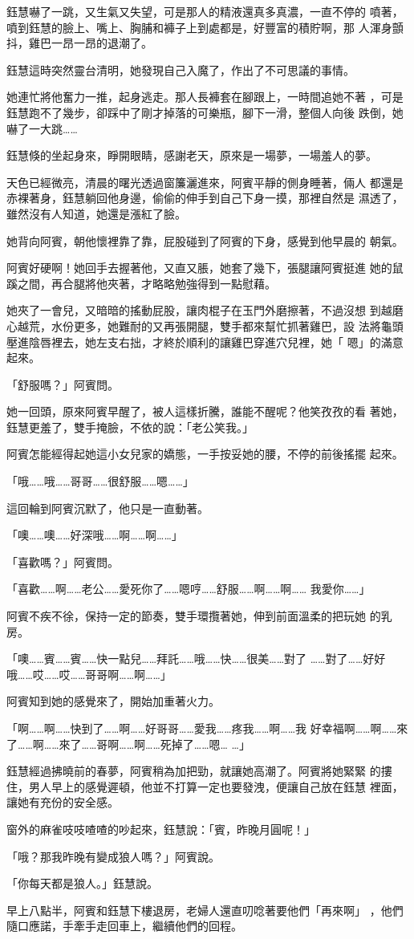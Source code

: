 鈺慧嚇了一跳，又生氣又失望，可是那人的精液還真多真濃，一直不停的
噴著，噴到鈺慧的臉上、嘴上、胸脯和褲子上到處都是，好豐富的積貯啊，那
人渾身顫抖，雞巴一昂一昂的退潮了。

鈺慧這時突然靈台清明，她發現自己入魔了，作出了不可思議的事情。

她連忙將他奮力一推，起身逃走。那人長褲套在腳跟上，一時間追她不著
，可是鈺慧跑不了幾步，卻踩中了剛才掉落的可樂瓶，腳下一滑，整個人向後
跌倒，她嚇了一大跳……

鈺慧倏的坐起身來，睜開眼睛，感謝老天，原來是一場夢，一場羞人的夢。

天色已經微亮，清晨的曙光透過窗簾灑進來，阿賓平靜的側身睡著，倆人
都還是赤裸著身，鈺慧躺回他身邊，偷偷的伸手到自己下身一摸，那裡自然是
濕透了，雖然沒有人知道，她還是漲紅了臉。

她背向阿賓，朝他懷裡靠了靠，屁股碰到了阿賓的下身，感覺到他早晨的
朝氣。

阿賓好硬啊！她回手去握著他，又直又脹，她套了幾下，張腿讓阿賓挺進
她的鼠蹊之間，再合腿將他夾著，才略略勉強得到一點慰藉。

她夾了一會兒，又暗暗的搖動屁股，讓肉棍子在玉門外磨擦著，不過沒想
到越磨心越荒，水份更多，她難耐的又再張開腿，雙手都來幫忙抓著雞巴，設
法將龜頭壓進陰唇裡去，她左支右拙，才終於順利的讓雞巴穿進穴兒裡，她「
嗯」的滿意起來。

「舒服嗎？」阿賓問。

她一回頭，原來阿賓早醒了，被人這樣折騰，誰能不醒呢？他笑孜孜的看
著她，鈺慧更羞了，雙手掩臉，不依的說：「老公笑我。」

阿賓怎能經得起她這小女兒家的嬌態，一手按妥她的腰，不停的前後搖擺
起來。

「哦……哦……哥哥……很舒服……嗯……」

這回輪到阿賓沉默了，他只是一直動著。

「噢……噢……好深哦……啊……啊……」

「喜歡嗎？」阿賓問。

「喜歡……啊……老公……愛死你了……嗯哼……舒服……啊……啊……
我愛你……」

阿賓不疾不徐，保持一定的節奏，雙手環攬著她，伸到前面溫柔的把玩她
的乳房。

「噢……賓……賓……快一點兒……拜託……哦……快……很美……對了
……對了……好好哦……哎……哎……哥哥啊……啊……」

阿賓知到她的感覺來了，開始加重著火力。

「啊……啊……快到了……啊……好哥哥……愛我……疼我……啊……我
好幸福啊……啊……來了……啊……來了……哥啊……啊……死掉了……嗯…
…」

鈺慧經過拂曉前的春夢，阿賓稍為加把勁，就讓她高潮了。阿賓將她緊緊
的摟住，男人早上的感覺遲頓，他並不打算一定也要發洩，便讓自己放在鈺慧
裡面，讓她有充份的安全感。

窗外的麻雀吱吱喳喳的吵起來，鈺慧說：「賓，昨晚月圓呢！」

「哦？那我昨晚有變成狼人嗎？」阿賓說。

「你每天都是狼人。」鈺慧說。

早上八點半，阿賓和鈺慧下樓退房，老婦人還直叨唸著要他們「再來啊」
，他們隨口應諾，手牽手走回車上，繼續他們的回程。










